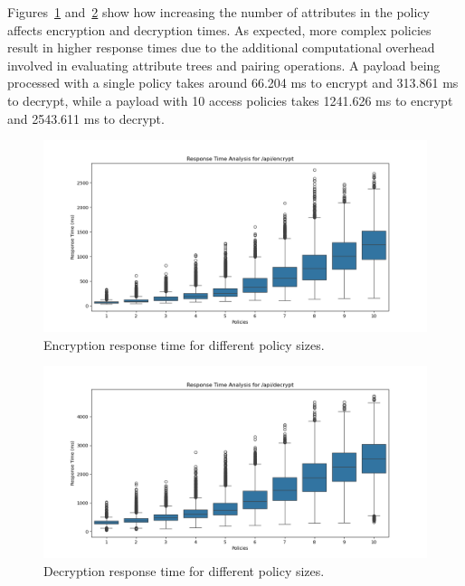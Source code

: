 \documentclass[cic,tc,english]{iiufrgs}
\numberwithin{algorithm}{chapter}
\begin{document}
            Figures~\ref{fig:encrypt_policy_size} and~\ref{fig:decrypt_policy_size} show how increasing the number of attributes in the policy affects encryption and decryption times. As expected, more complex policies result in higher response times due to the additional computational overhead involved in evaluating attribute trees and pairing operations. A payload being processed with a single policy takes around 66.204 ms to encrypt and 313.861 ms to decrypt, while a payload with 10 access policies takes 1241.626 ms to encrypt and 2543.611 ms to decrypt.

            \begin{figure}
                \centering
                \includegraphics[width=\textwidth]{images/phase4/response_time_api_encrypt.png}
                \caption{Encryption response time for different policy sizes.}
                \label{fig:encrypt_policy_size}
            \end{figure}

            \begin{figure}
                \centering
                \includegraphics[width=\textwidth]{images/phase4/response_time_api_decrypt.png}
                \caption{Decryption response time for different policy sizes.}
                \label{fig:decrypt_policy_size}
            \end{figure}
\end{document}
